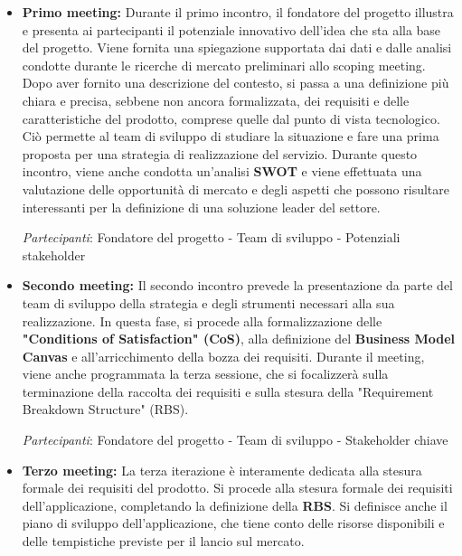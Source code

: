 \documentclass[oneside]{book}
\begin{document}
\begin{itemize}
\item \textbf{Primo meeting:} Durante il primo incontro, il fondatore del progetto illustra e presenta ai partecipanti il potenziale innovativo dell'idea che sta alla base del progetto. Viene fornita una spiegazione supportata dai dati e dalle analisi condotte durante le ricerche di mercato preliminari allo scoping meeting. \newline Dopo aver fornito una descrizione del contesto, si passa a una definizione più chiara e precisa, sebbene non ancora formalizzata, dei requisiti e delle caratteristiche del prodotto, comprese quelle dal punto di vista tecnologico. \newline Ciò permette al team di sviluppo di studiare la situazione e fare una prima proposta per una strategia di realizzazione del servizio. Durante questo incontro, viene anche condotta un'analisi \textbf{SWOT} e viene effettuata una valutazione delle opportunità di mercato e degli aspetti che possono risultare interessanti per la definizione di una soluzione leader del settore.

\textit{Partecipanti}: Fondatore del progetto - Team di sviluppo - Potenziali stakeholder

\item \textbf{Secondo meeting:} Il secondo incontro prevede la presentazione da parte del team di sviluppo della strategia e degli strumenti necessari alla sua realizzazione. \newline In questa fase, si procede alla formalizzazione delle \textbf{"Conditions of Satisfaction" (CoS)}, alla definizione del \textbf{Business Model Canvas} e all'arricchimento della bozza dei requisiti. \newline Durante il meeting, viene anche programmata la terza sessione, che si focalizzerà sulla terminazione della raccolta dei requisiti e sulla stesura della "Requirement Breakdown Structure" (RBS).

\textit{Partecipanti}: Fondatore del progetto - Team di sviluppo - Stakeholder chiave

\item \textbf{Terzo meeting:} La terza iterazione è interamente dedicata alla stesura formale dei requisiti del prodotto. Si procede alla stesura formale dei requisiti dell'applicazione, completando la definizione della \textbf{RBS}. \newline Si definisce anche il piano di sviluppo dell'applicazione, che tiene conto delle risorse disponibili e delle tempistiche previste per il lancio sul mercato.


\end{itemize}
\end{document}
